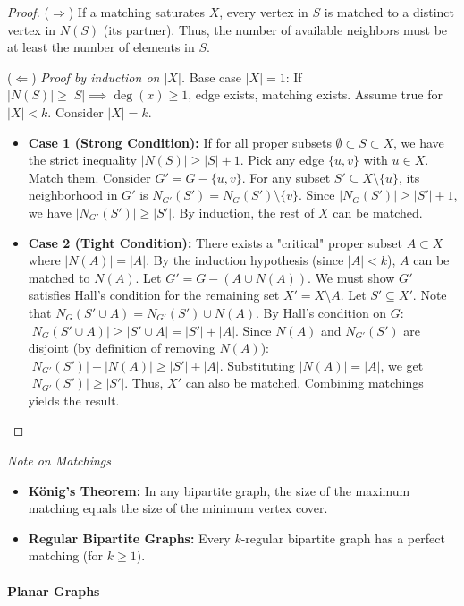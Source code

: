 \documentclass[oneside]{book}
\begin{document}
\begin{proof}
($\Rightarrow$) If a matching saturates $X$, every vertex in $S$ is matched to a distinct vertex in $N(S)$ (its partner). Thus, the number of available neighbors must be at least the number of elements in $S$.

($\Leftarrow$) \textit{Proof by induction on $|X|$.}
Base case $|X|=1$: If $|N(S)| \ge |S| \implies \deg(x) \ge 1$, edge exists, matching exists.
Assume true for $|X| < k$. Consider $|X|=k$.
\begin{itemize}
    \item \textbf{Case 1 (Strong Condition):} If for all proper subsets $\emptyset \subset S \subset X$, we have the strict inequality $|N(S)| \ge |S| + 1$.
    Pick any edge $\{u, v\}$ with $u \in X$. Match them. Consider $G' = G - \{u, v\}$.
    For any subset $S' \subseteq X \setminus \{u\}$, its neighborhood in $G'$ is $N_{G'}(S') = N_G(S') \setminus \{v\}$.
    Since $|N_G(S')| \ge |S'| + 1$, we have $|N_{G'}(S')| \ge |S'|$.
    By induction, the rest of $X$ can be matched.

    \item \textbf{Case 2 (Tight Condition):} There exists a "critical" proper subset $A \subset X$ where $|N(A)| = |A|$.
    By the induction hypothesis (since $|A| < k$), $A$ can be matched to $N(A)$.
    Let $G' = G - (A \cup N(A))$. We must show $G'$ satisfies Hall's condition for the remaining set $X' = X \setminus A$.
    Let $S' \subseteq X'$. Note that $N_G(S' \cup A) = N_{G'}(S') \cup N(A)$.
    By Hall's condition on $G$: $|N_G(S' \cup A)| \ge |S' \cup A| = |S'| + |A|$.
    Since $N(A)$ and $N_{G'}(S')$ are disjoint (by definition of removing $N(A)$):
    $|N_{G'}(S')| + |N(A)| \ge |S'| + |A|$.
    Substituting $|N(A)| = |A|$, we get $|N_{G'}(S')| \ge |S'|$.
    Thus, $X'$ can also be matched. Combining matchings yields the result.
\end{itemize}
\end{proof}

\textit{Note on Matchings}
\begin{itemize}
    \item \textbf{König's Theorem:} In any bipartite graph, the size of the maximum matching equals the size of the minimum vertex cover.
    \item \textbf{Regular Bipartite Graphs:} Every $k$-regular bipartite graph has a perfect matching (for $k \geq 1$).
\end{itemize}

\paragraph{Planar Graphs}
\end{document}
